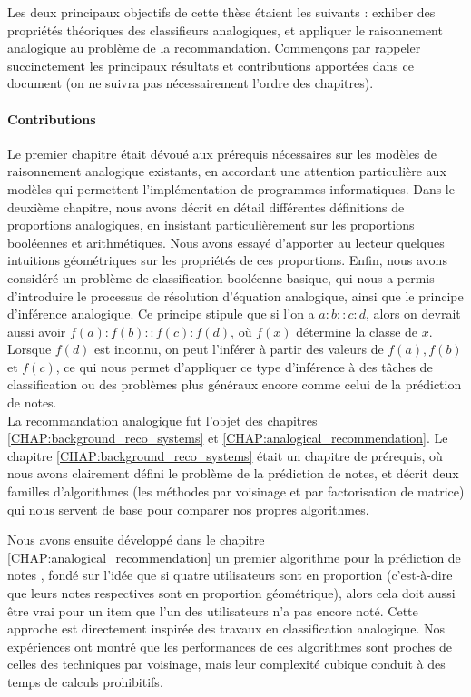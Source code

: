 Les deux principaux objectifs de cette thèse étaient les suivants : exhiber des
propriétés théoriques des classifieurs analogiques, et appliquer le
raisonnement analogique au problème de la recommandation. Commençons par
rappeler succinctement les principaux résultats et contributions apportées dans
ce document (on ne suivra pas nécessairement l'ordre des chapitres).

\paragraph{Contributions\\}

Le premier chapitre était dévoué aux prérequis nécessaires sur les modèles de
raisonnement analogique existants, en accordant une attention particulière aux
modèles qui permettent l'implémentation de programmes informatiques. Dans le
deuxième chapitre, nous avons décrit en détail différentes définitions de
proportions analogiques, en insistant particulièrement sur les proportions
booléennes et arithmétiques. Nous avons essayé d'apporter au lecteur quelques
intuitions géométriques sur les propriétés de ces proportions. Enfin, nous
avons considéré un problème de classification booléenne basique, qui nous a
permis d'introduire le processus de résolution d'équation analogique, ainsi que
le principe d'inférence analogique. Ce principe stipule que si l'on a
$a:b::c:d$, alors on devrait aussi avoir $f(a):f(b)::f(c):f(d)$, où $f(x)$
détermine la classe de $x$. Lorsque $f(d)$ est inconnu, on peut l'inférer à
partir des valeurs de $f(a), f(b)$ et $f(c)$, ce qui nous permet d'appliquer ce
type d'inférence à des tâches de classification ou des problèmes plus généraux
encore comme celui de la prédiction de notes.\\

La recommandation analogique fut l'objet des chapitres
\ref{CHAP:background_reco_systems} et \ref{CHAP:analogical_recommendation}.
Le chapitre \ref{CHAP:background_reco_systems} était un chapitre de prérequis, où
nous avons clairement défini le problème de la prédiction de notes, et décrit
deux familles d'algorithmes (les méthodes par voisinage et par factorisation de
matrice) qui nous servent de base pour comparer nos propres algorithmes.

Nous avons ensuite développé dans le chapitre
\ref{CHAP:analogical_recommendation} un premier algorithme pour la prédiction
de notes  \cite{HugPraRicISMIS15}, fondé sur l'idée que si quatre utilisateurs
sont en proportion (c'est-à-dire que leurs notes respectives sont en proportion
géométrique), alors cela doit aussi être vrai pour un item que l'un des
utilisateurs n'a pas encore noté. Cette approche est directement inspirée des
travaux en classification analogique. Nos expériences ont montré que les
performances de ces algorithmes sont proches de celles des techniques par
voisinage, mais leur complexité cubique conduit à des temps de calculs
prohibitifs.

